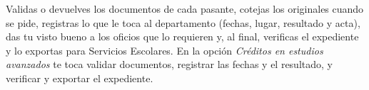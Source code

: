 \documentclass[11pt,a4paper]{article}
\begin{document}
{\small\tableofcontents}
\newpage
\begin{quevasahacer}
Validas o devuelves los documentos de cada pasante, cotejas los originales cuando se pide, registras lo que le toca al departamento (fechas, lugar, resultado y acta), das tu visto bueno a los oficios que lo requieren y, al final, verificas el expediente y lo exportas para Servicios Escolares. En la opción \emph{Créditos en estudios avanzados} te toca validar documentos, registrar las fechas y el resultado, y verificar y exportar el expediente.
\end{quevasahacer}



\end{document}
